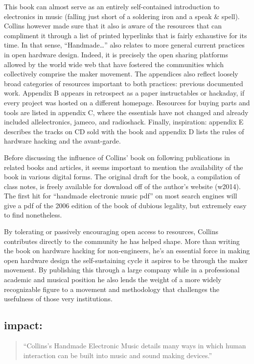 This book can almost serve as an entirely self-contained introduction to electronics in music (falling just short of a soldering iron and a speak \& spell). Collins however made sure that it also is aware of the resources that can compliment it through a list of printed hyperlinks that is fairly exhaustive for its time. In that sense, “Handmade…” also relates to more general current practices in open hardware design. Indeed, it is precisely the open sharing platforms allowed by the world wide web that have fostered the communities which collectively comprise the maker movement. The appendices also reflect loosely broad categories of resources important to both practices: previous documented work. Appendix B appears in retrospect as a paper instructables or hackaday, if every project was hosted on a different homepage. Resources for buying parts and tools are listed in appendix C, where the essentials have not changed and already included allelectronics, jameco, and radioshack. Finally, inspiration: appendix E describes the tracks on CD sold with the book and appendix D lists the rules of hardware hacking and the avant-garde. 
	
	Before discussing the influence of Collins’ book on following publications in related books and articles, it seems important to mention the availability of the book in various digital forms. The original draft for the book, a compilation of class notes, is freely available for download off of the author’s website (w2014). The first hit for “handmade electronic music pdf” on most search engines will give a pdf of the 2006 edition of the book of dubious legality, but extremely easy to find nonetheless. 

	By tolerating or passively encouraging open access to resources, Collins contributes directly to the community he has helped shape. More than writing the book on hardware hacking for non-engineers, he’s an essential force in making open hardware design the self-sustaining cycle it aspires to be through the maker movement. By publishing this through a large company while in a professional academic and musical position he also lends the weight of a more widely recognizable figure to a movement and methodology that challenges the usefulness of those very institutions.

\subsection{impact:}  

\begin{quote}

“Collins’s Handmade Electronic Music details many ways in which human interaction can be built into music and sound making devices.”

\cite{mills2010}

\end{quote}

